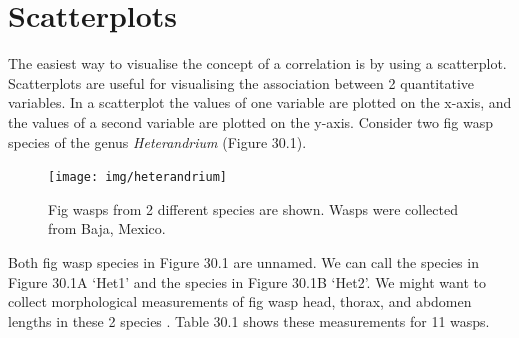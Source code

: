 \documentclass[
  openany]{krantz}
\begin{document}
\hypertarget{scatterplots}{%
\section{Scatterplots}\label{scatterplots}}

The easiest way to visualise the concept of a correlation is by using a scatterplot.
Scatterplots are useful for visualising the association between 2 quantitative variables.
In a scatterplot the values of one variable are plotted on the x-axis, and the values of a second variable are plotted on the y-axis.
Consider two fig wasp species of the genus \emph{Heterandrium} (Figure 30.1).

\begin{figure}
\texttt{[image: img/heterandrium]} \caption{Fig wasps from 2 different species are shown. Wasps were collected from Baja, Mexico.}\label{fig:unnamed-chunk-125}
\end{figure}

Both fig wasp species in Figure 30.1 are unnamed.
We can call the species in Figure 30.1A `Het1' and the species in Figure 30.1B `Het2'.
We might want to collect morphological measurements of fig wasp head, thorax, and abdomen lengths in these 2 species \citep{Duthie2015b}.
Table 30.1 shows these measurements for 11 wasps.
\end{document}
